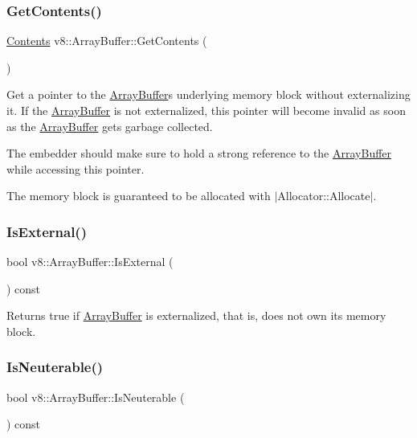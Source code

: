 \subsubsection{\texorpdfstring{Get\+Contents()}{GetContents()}}
{\footnotesize\ttfamily \mbox{\hyperlink{classv8_1_1ArrayBuffer_1_1Contents}{Contents}} v8\+::\+Array\+Buffer\+::\+Get\+Contents (\begin{DoxyParamCaption}{ }\end{DoxyParamCaption})}

Get a pointer to the \mbox{\hyperlink{classv8_1_1ArrayBuffer}{Array\+Buffer}}\textquotesingle{}s underlying memory block without externalizing it. If the \mbox{\hyperlink{classv8_1_1ArrayBuffer}{Array\+Buffer}} is not externalized, this pointer will become invalid as soon as the \mbox{\hyperlink{classv8_1_1ArrayBuffer}{Array\+Buffer}} gets garbage collected.

The embedder should make sure to hold a strong reference to the \mbox{\hyperlink{classv8_1_1ArrayBuffer}{Array\+Buffer}} while accessing this pointer.

The memory block is guaranteed to be allocated with $\vert$\+Allocator\+::\+Allocate$\vert$. \mbox{\label{classv8_1_1ArrayBuffer_a22ecea76af2257b12bdb69b40d9bec8f}} 
\subsubsection{\texorpdfstring{Is\+External()}{IsExternal()}}
{\footnotesize\ttfamily bool v8\+::\+Array\+Buffer\+::\+Is\+External (\begin{DoxyParamCaption}{ }\end{DoxyParamCaption}) const}

Returns true if \mbox{\hyperlink{classv8_1_1ArrayBuffer}{Array\+Buffer}} is externalized, that is, does not own its memory block. \mbox{\label{classv8_1_1ArrayBuffer_a5de3f4c29744bd89204462f987ecb626}} 
\subsubsection{\texorpdfstring{Is\+Neuterable()}{IsNeuterable()}}
{\footnotesize\ttfamily bool v8\+::\+Array\+Buffer\+::\+Is\+Neuterable (\begin{DoxyParamCaption}{ }\end{DoxyParamCaption}) const}

